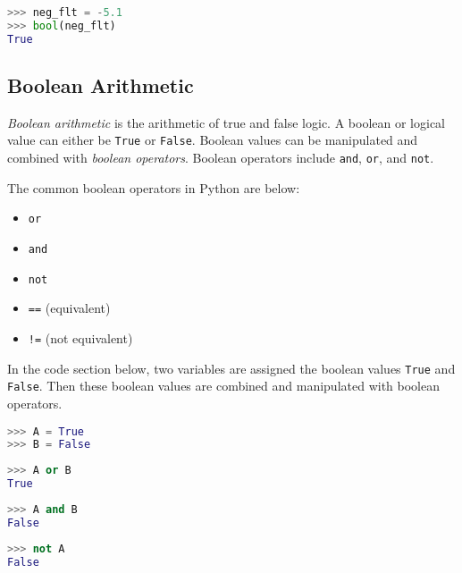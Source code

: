 \documentclass{book}
\providecommand{\tightlist}{%
      \setlength{\itemsep}{0pt}\setlength{\parskip}{0pt}}
\newcommand{\passthrough}[1]{#1}
\begin{document}
\begin{lstlisting}[language=Python]
>>> neg_flt = -5.1
>>> bool(neg_flt)
True
\end{lstlisting}
    




    
        \hypertarget{boolean-arithmetic}{%
\subsection{Boolean Arithmetic}\label{boolean-arithmetic}}

\emph{Boolean arithmetic} is the arithmetic of true and false logic. A
boolean or logical value can either be \passthrough{\lstinline!True!} or
\passthrough{\lstinline!False!}. Boolean values can be manipulated and
combined with \emph{boolean operators}. Boolean operators include
\passthrough{\lstinline!and!}, \passthrough{\lstinline!or!}, and
\passthrough{\lstinline!not!}.

The common boolean operators in Python are below:

\begin{itemize}
\tightlist
\item
  \passthrough{\lstinline!or!}
\item
  \passthrough{\lstinline!and!}
\item
  \passthrough{\lstinline!not!}
\item
  \passthrough{\lstinline!==!} (equivalent)
\item
  \passthrough{\lstinline"!="} (not equivalent)
\end{itemize}

In the code section below, two variables are assigned the boolean values
\passthrough{\lstinline!True!} and \passthrough{\lstinline!False!}. Then
these boolean values are combined and manipulated with boolean
operators.

\begin{lstlisting}[language=Python]
>>> A = True
>>> B = False
\end{lstlisting}

\begin{lstlisting}[language=Python]
>>> A or B
True
\end{lstlisting}

\begin{lstlisting}[language=Python]
>>> A and B
False
\end{lstlisting}

\begin{lstlisting}[language=Python]
>>> not A
False
\end{lstlisting}
\end{document}
